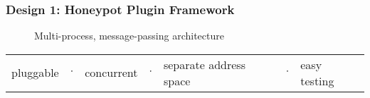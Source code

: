 \begin{frame}
\frametitle{Design 1: Honeypot Plugin Framework}

\begin{figure}
\centering
\caption{Multi-process, message-passing architecture}
{%
\scalebox{0.53}{}
}
\end{figure}

\begin{table}
\centering
\begin{tabular}{l l l l l l l}
pluggable & $\cdot$ & concurrent & $\cdot$ & separate address space & $\cdot$ & easy testing \\
\end{tabular}
\end{table}

\end{frame}
